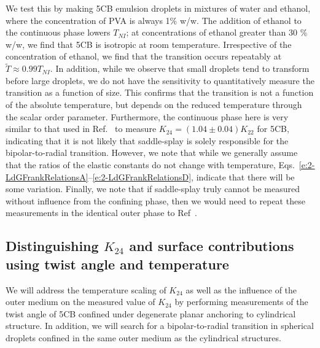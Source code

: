 We test this by making 5CB emulsion droplets in mixtures of water and ethanol, where the concentration of PVA is always 1\% w/w.
The addition of ethanol to the continuous phase lowers $T_{NI}$; at concentrations of ethanol greater than 30 \% w/w, we find that 5CB is isotropic at room temperature.
Irrespective of the concentration of ethanol, we find that the transition occurs repeatably at $\tilde{T} \approx 0.99 T_{NI}$.
In addition, while we observe that small droplets tend to transform before large droplets, we do not have the sensitivity to quantitatively measure the transition as a function of size.
This confirms that the transition is not a function of the absolute temperature, but depends on the reduced temperature through the scalar order parameter.
Furthermore, the continuous phase here is very similar to that used in Ref.~\cite{RN24} to measure $K_{24} =(1.04 \pm 0.04)K_{22}$ for 5CB, indicating that it is not likely that saddle-splay is solely responsible for the bipolar-to-radial transition.
However, we note that while we generally assume that the ratios of the elastic constants do not change with temperature, Eqs.~\ref{e:2-LdGFrankRelationsA}--\ref{e:2-LdGFrankRelationsD}, indicate that there will be some variation.
Finally, we note that if saddle-splay truly cannot be measured without influence from the confining phase, then we would need to repeat these measurements in the identical outer phase to Ref~\cite{RN24}.


\subsection{Distinguishing $K_{24}$ and surface contributions using twist angle and temperature}
We will address the temperature scaling of $K_{24}$ as well as the influence of the outer medium on the measured value of $K_{24}$ by performing measurements of the twist angle of 5CB confined under degenerate planar anchoring to cylindrical structure.
In addition, we will search for a bipolar-to-radial transition in spherical droplets confined in the same outer medium as the cylindrical structures.
